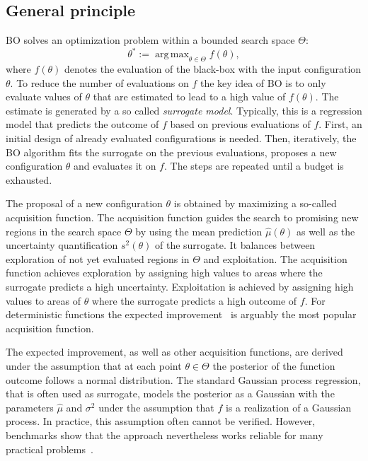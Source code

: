 \documentclass[bimj,fleqn]{w-art}
\theoremstyle{plain}
\theoremstyle{definition}
\begin{document}
\subsection{General principle}
BO solves an optimization problem within a bounded search space $\Theta$:
\[
\theta^\ast := \operatorname{arg\,max}_{\theta \in \Theta} f(\theta),
\]
where $f(\theta)$ denotes the evaluation of the black-box with the input configuration $\theta$.
To reduce the number of evaluations on $f$ the key idea of BO is to only evaluate values of $\theta$ that are estimated to lead to a high value of $f(\theta)$.
The estimate is generated by a so called \emph{surrogate model}.
Typically, this is a regression model that predicts the outcome of $f$ based on previous evaluations of $f$.
First, an initial design of already evaluated configurations is needed.
Then, iteratively, the BO algorithm fits the surrogate on the previous evaluations, proposes a new configuration $\theta$ and evaluates it on $f$.
The steps are repeated until a budget is exhausted.

The proposal of a new configuration $\theta$ is obtained by maximizing a so-called acquisition function.
The acquisition function guides the search to promising new regions in the search space $\Theta$ by using the mean prediction $\hat{\mu}(\theta)$ as well as the uncertainty quantification $s^2(\theta)$ of the surrogate.
It balances between exploration of not yet evaluated regions in $\Theta$ and exploitation.
The acquisition function achieves exploration by assigning high values to areas where the surrogate predicts a high uncertainty.
Exploitation is achieved by assigning high values to areas of $\theta$ where the surrogate predicts a high outcome of $f$.
For deterministic functions the expected improvement~\citep{jones_efficient_1998} is arguably the most popular acquisition function.

The expected improvement, as well as other acquisition functions, are derived under the assumption that at each point $\theta \in \Theta$ the posterior of the function outcome follows a normal distribution.
The standard Gaussian process regression, that is often used as surrogate, models the posterior as a Gaussian with the parameters $\hat{\mu}$ and $\sigma^2$ under the assumption that $f$ is a realization of a Gaussian process.
In practice, this assumption often cannot be verified.
However, benchmarks show that the approach nevertheless works reliable for many practical problems~\citep{bischl_mlrmbo_2017,snoek_practical_2012}.
\end{document}
